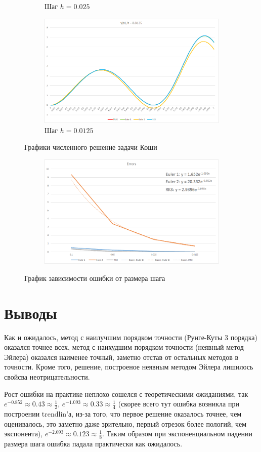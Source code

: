 \documentclass[11pt,a4paper,oneside]{article}
\begin{document}
\begin{figure}[h]
\begin{subfigure}{0.5\textwidth}
		\caption{Шаг $h=0.025$}
	\end{subfigure}
	\begin{subfigure}{0.5\textwidth}
		\centering
		\includegraphics[width=0.9\linewidth]{pics/plot4.png}
		\caption{Шаг $h=0.0125$}
	\end{subfigure}
	\caption{Графики численного решение задачи Коши}
\end{figure}

\begin{figure}[h]
	\begin{subfigure}{\textwidth}
		\centering
		\includegraphics[width=0.9\linewidth]{pics/errors.png}
	\end{subfigure}
	\caption{График зависимости ошибки от размера шага}
\end{figure}

\section{Выводы}

Как и ожидалось, метод с наилучшим порядком точности (Рунге-Куты 3 порядка) оказался точнее всех, метод с наихудшим порядком точности (неявный метод Эйлера) оказался наименее точный, заметно отстав от остальных методов в точности. Кроме того, решение, построеное неявным методом Эйлера лишилось свойсва неотрицательности.

Рост ошибки на практике неплохо сошелся с теоретическими ожиданиями, так $e^{-0.852} \approx 0.43 \approx \frac{1}{2}$, $e^{-1.093} \approx 0.33 \approx \frac{1}{4}$ (скорее всего тут ошибка возникла при построении trendlin'а, из-за того, что первое решение оказалось точнее, чем оценивалось, это заметно даже зрительно, первый отрезок более пологий, чем экспонента), $e^{-2.093} \approx 0.123 \approx \frac{1}{8}$. Таким образом при экспоненциальном падении размера шага ошибка падала практически как ожидалось.
\end{document}
